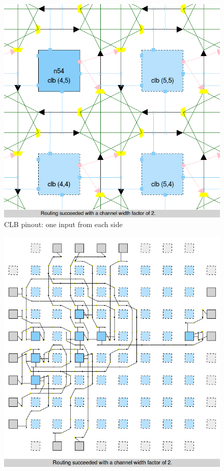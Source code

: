 \begin{itemize}
\begin{figure}[H]
\centering
\includegraphics[scale=0.4]{BTP_work/5-bit_adder_on_spread_IO_clb/clb_pinout.png}
\caption{CLB pinout: one input from each side}
\label{fig:Figure}
\end{figure}
\begin{figure}[H]
\centering
\includegraphics[scale=0.32]{BTP_work/5-bit_adder_on_spread_IO_clb/routing.png}

\end{figure}
\end{itemize}

